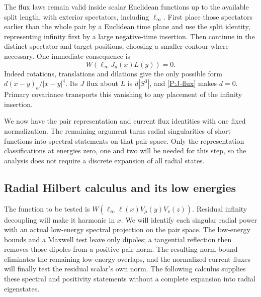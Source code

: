 The flux laws remain valid inside scalar Euclidean functions up to the
available split length, with exterior spectators, including
$\ell_\infty$.  First place those spectators earlier than the whole
pair by a Euclidean time plane and use the split identity, representing
infinity first by a large negative-time insertion.  Then continue in
the distinct spectator and target positions, choosing a smaller
contour where necessary.  One immediate consequence is
\begin{equation}
 W(\ell_\infty J_a(x)L(y))=0.
 \label{P:ell-J-L}
\end{equation}
Indeed rotations, translations and dilations give the only possible
form $d(x-y)_a/|x-y|^4$.  Its $J$ flux about $L$ is $d|S^3|$, and
\eqref{P:J-flux} makes $d=0$.  Primary covariance transports this
vanishing to any placement of the infinity insertion.

We now have the pair representation and current flux identities
with one fixed normalization.  The remaining argument turns radial
singularities of short functions into spectral statements on that
pair space.  Only the representation classifications at energies
zero, one and two will be needed for this step, so the analysis does
not require a discrete expansion of
all radial states.

\subsection{Radial Hilbert calculus and its low energies}

The function to be tested is
$W(\ell_\infty\ell(x)V_\mu(y)V_\nu(z))$.
Residual infinity decoupling will make it harmonic in $x$.  We will
identify each singular radial power with an actual low-energy spectral
projection on the pair space.  The low-energy bounds and a Maxwell
test leave only dipoles; a tangential reflection then removes those
dipoles from a positive pair norm.  The resulting norm bound eliminates
the remaining low-energy overlaps, and the normalized current fluxes
will finally test the residual scalar's own norm.  The following
calculus supplies these spectral and positivity statements without a
complete expansion into radial eigenstates.

